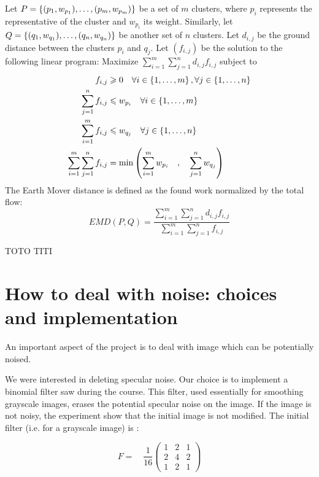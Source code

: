 \begin{defi}
	Let $P = \left\{ (p_1,w_{p_1}), \dots, (p_m,w_{p_m}) \right\}$ be a set of $m$ clusters, where $p_i$ represents the representative of the cluster and $w_{p_i}$ its weight. Similarly, let $Q = \left\{ (q_1,w_{q_1}), \dots, (q_n,w_{q_n}) \right\}$ be another set of $n$ clusters. Let $d_{i,j}$ be the ground distance between the clusters $p_i$ and $q_j$.
	Let $(f_{i,j})$ be the solution to the following linear program:
	Maximize $\sum_{i=1}^m \sum_{j=1}^n d_{i,j} f_{i,j}$ subject to
\[
    \begin{aligned}
        f_{i,j} &\geqslant 0  \quad \forall i \in \left\{ 1, \dots, m \right\}, \forall j \in \left\{ 1, \dots, n \right\} \\
        \sum_{j=1}^{n}{f_{i,j}} &\leqslant w_{p_i} \quad \forall i \in \left\{ 1, \dots, m \right\}\\
        \sum_{i=1}^{m}{f_{i,j}} &\leqslant w_{q_j} \quad \forall j \in \left\{ 1, \dots, n \right\} \\
        \sum_{i=1}^m \sum_{j=1}^n f_{i,j} &= \operatorname{min} \left( \sum_{i=1}^m w_{p_i} \quad,\quad \sum_{j=1}^n w_{q_j}\right)
    \end{aligned}
\]
The Earth Mover distance is defined as the found work normalized by the total flow:
\[
	EMD(P,Q) = \frac{\sum_{i=1}^m \sum_{j=1}^n d_{i,j} f_{i,j}}{\sum_{i=1}^m \sum_{j=1}^n f_{i,j}}
\]
\end{defi}

TOTO TITI


\section{How to deal with noise: choices and implementation}

An important aspect of the project is to deal with image which can be potentially noised.

We were interested in deleting specular noise. Our choice is to implement a binomial filter saw during the course. This filter, used essentially for smoothing grayscale images, erases the potential specular noise on the image. If the image is not noisy, the experiment show that the initial image is not modified. The initial filter (i.e. for a grayscale image) is :

\setcounter{MaxMatrixCols}{3}
\[ F = \quad \frac{1}{16} \begin{pmatrix}
1 & 2 & 1 \\
2 & 4 & 2 \\
1 & 2 & 1
\end{pmatrix}\]

